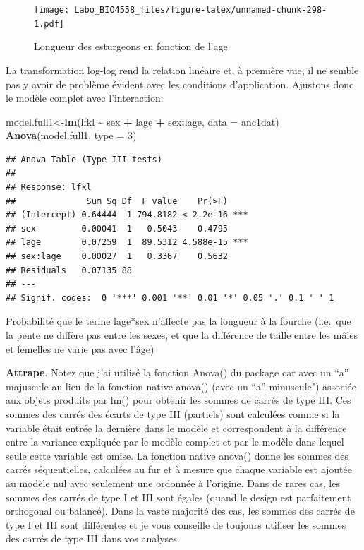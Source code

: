 \documentclass[
  12pt,
]{book}
\newenvironment{Shaded}{\begin{snugshade}}{\end{snugshade}}
\newcommand{\DataTypeTok}[1]{\textcolor[rgb]{0.13,0.29,0.53}{#1}}
\newcommand{\DecValTok}[1]{\textcolor[rgb]{0.00,0.00,0.81}{#1}}
\newcommand{\KeywordTok}[1]{\textcolor[rgb]{0.13,0.29,0.53}{\textbf{#1}}}
\newcommand{\NormalTok}[1]{#1}
\newcommand{\OperatorTok}[1]{\textcolor[rgb]{0.81,0.36,0.00}{\textbf{#1}}}
\newcommand{\StringTok}[1]{\textcolor[rgb]{0.31,0.60,0.02}{#1}}
\begin{document}
\begin{figure}
\centering
\texttt{[image: Labo\_BIO4558\_files/figure-latex/unnamed-chunk-298-1.pdf]}
\caption{\label{fig:unnamed-chunk-298}Longueur des esturgeons en fonction de l'age}
\end{figure}

La transformation log-log rend la relation linéaire et, à première vue, il ne semble pas y avoir de problème évident avec les conditions d'application. Ajustons donc le modèle complet avec l'interaction:

\begin{Shaded}
\begin{Highlighting}[]
\NormalTok{model.full1\textless{}{-}}\KeywordTok{lm}\NormalTok{(lfkl }\OperatorTok{\textasciitilde{}}\StringTok{ }\NormalTok{sex }\OperatorTok{+}\StringTok{ }\NormalTok{lage }\OperatorTok{+}\StringTok{ }\NormalTok{sex}\OperatorTok{:}\NormalTok{lage, }\DataTypeTok{data =}\NormalTok{ anc1dat)}
\KeywordTok{Anova}\NormalTok{(model.full1, }\DataTypeTok{type =} \DecValTok{3}\NormalTok{)}
\end{Highlighting}
\end{Shaded}

\begin{verbatim}
## Anova Table (Type III tests)
## 
## Response: lfkl
##              Sum Sq Df  F value    Pr(>F)    
## (Intercept) 0.64444  1 794.8182 < 2.2e-16 ***
## sex         0.00041  1   0.5043    0.4795    
## lage        0.07259  1  89.5312 4.588e-15 ***
## sex:lage    0.00027  1   0.3367    0.5632    
## Residuals   0.07135 88                       
## ---
## Signif. codes:  0 '***' 0.001 '**' 0.01 '*' 0.05 '.' 0.1 ' ' 1
\end{verbatim}

Probabilité que le terme lage*sex n'affecte pas la longueur à la fourche (i.e.~que la pente ne diffère pas entre les sexes, et que la différence de taille entre les mâles et femelles ne varie pas avec l'âge)

\textbf{Attrape}. Notez que j'ai utilisé la fonction Anova() du package car avec un ``a'' majuscule au lieu de la fonction native anova() (avec un ``a'' minuscule") associée aux objets produits par lm() pour obtenir les sommes de carrés de type III. Ces sommes des carrés des écarts de type III (partiels) sont calculées comme si la variable était entrée la dernière dans le modèle et correspondent à la différence entre la variance expliquée par le modèle complet et par le modèle dans lequel seule cette variable est omise. La fonction native anova() donne les sommes des carrés séquentielles, calculées au fur et à mesure que chaque variable est ajoutée au modèle nul avec seulement une ordonnée à l'origine. Dans de rares cas, les sommes des carrés de type I et III sont égales (quand le design est parfaitement orthogonal ou balancé). Dans la vaste majorité des cas, les sommes des carrés de type I et III sont différentes et je vous conseille de toujours utiliser les sommes des carrés de type III dans vos analyses.
\end{document}
